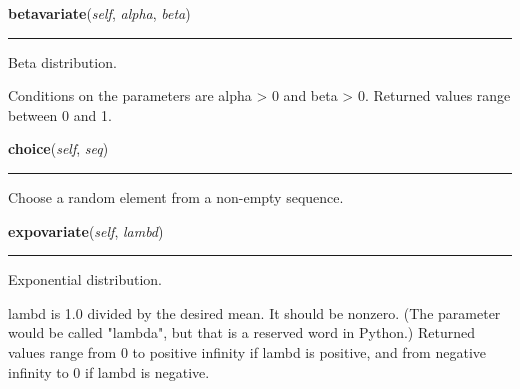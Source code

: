     \label{random:Random:betavariate}

    \vspace{0.5ex}

\hspace{.8\funcindent}\begin{boxedminipage}{\funcwidth}

    \raggedright \textbf{betavariate}(\textit{self}, \textit{alpha}, \textit{beta})

    \vspace{-1.5ex}

    \rule{\textwidth}{0.5\fboxrule}
\setlength{\parskip}{2ex}
    Beta distribution.

    Conditions on the parameters are alpha {\textgreater} 0 and beta 
    {\textgreater} 0. Returned values range between 0 and 1.

\setlength{\parskip}{1ex}
    \end{boxedminipage}

    \label{random:Random:choice}

    \vspace{0.5ex}

\hspace{.8\funcindent}\begin{boxedminipage}{\funcwidth}

    \raggedright \textbf{choice}(\textit{self}, \textit{seq})

    \vspace{-1.5ex}

    \rule{\textwidth}{0.5\fboxrule}
\setlength{\parskip}{2ex}
    Choose a random element from a non-empty sequence.

\setlength{\parskip}{1ex}
    \end{boxedminipage}

    \label{random:Random:expovariate}

    \vspace{0.5ex}

\hspace{.8\funcindent}\begin{boxedminipage}{\funcwidth}

    \raggedright \textbf{expovariate}(\textit{self}, \textit{lambd})

    \vspace{-1.5ex}

    \rule{\textwidth}{0.5\fboxrule}
\setlength{\parskip}{2ex}
    Exponential distribution.

    lambd is 1.0 divided by the desired mean.  It should be nonzero.  (The 
    parameter would be called "lambda", but that is a reserved word in 
    Python.)  Returned values range from 0 to positive infinity if lambd is
    positive, and from negative infinity to 0 if lambd is negative.

\setlength{\parskip}{1ex}
    \end{boxedminipage}

